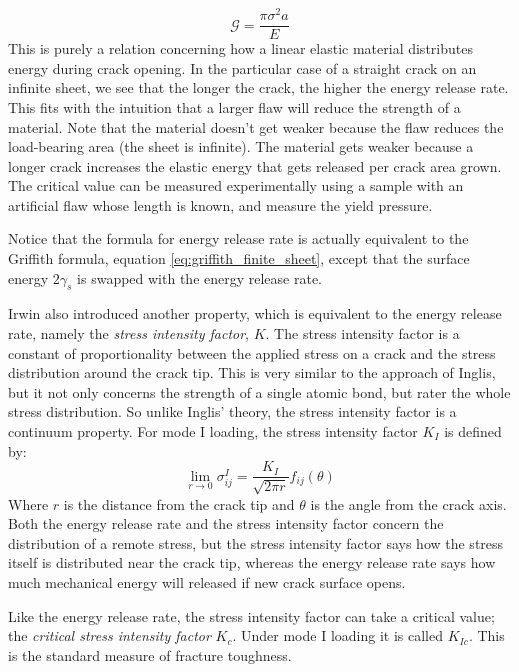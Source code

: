 \begin{equation}
	\mathcal{G} = \frac{\pi \sigma^2 a}{E}
\end{equation}
%
This is purely a relation concerning how a linear elastic material distributes energy during crack opening. In the particular case of a straight crack on an infinite sheet, we see that the longer the crack, the higher the energy release rate. This fits with the intuition that a larger flaw will reduce the strength of a material. Note that the material doesn't get weaker because the flaw reduces the load-bearing area (the sheet is infinite). The material gets weaker because a longer crack increases the elastic energy that gets released per crack area grown. The critical value can be measured experimentally using a sample with an artificial flaw whose length is known, and measure the yield pressure. 

Notice that the formula for energy release rate is actually equivalent to the Griffith formula, equation \ref{eq:griffith_finite_sheet}, except that the surface energy $2\gamma_s$ is swapped with the energy release rate.

Irwin also introduced another property, which is equivalent to the energy release rate, namely the \emph{stress intensity factor}, $K$. The stress intensity factor is a constant of proportionality between the applied stress on a crack and the stress distribution around the crack tip. This is very similar to the approach of Inglis, but it not only concerns the strength of a single atomic bond, but rater the whole stress distribution. So unlike Inglis' theory, the stress intensity factor is a continuum property. For mode I loading, the stress intensity factor $K_I$ is defined by:
\begin{equation}
	\lim_{r \to 0} \sigma_{ij}^I = \frac{K_I}{\sqrt{2\pi r}} f_{ij}(\theta)
\end{equation}
Where $r$ is the distance from the crack tip and $\theta$ is the angle from the crack axis. Both the energy release rate and the stress intensity factor concern the distribution of a remote stress, but the stress intensity factor says how the stress itself is distributed near the crack tip, whereas the energy release rate says how much mechanical energy will released if new crack surface opens. 

Like the energy release rate, the stress intensity factor can take a critical value; the \emph{critical stress intensity factor} $K_c$. Under mode I loading it is called $K_{Ic}$. This is the standard measure of fracture toughness.

